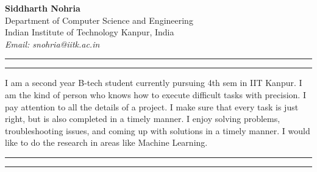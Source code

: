 \documentclass{article}
\begin{document}
\begin{flushleft}
\textbf{Siddharth Nohria} \\
Department of Computer Science and Engineering \\
Indian Institute of Technology Kanpur, India \\
\textit{Email: snohria@iitk.ac.in} \\
\end{flushleft}
\hrule
\vspace{0.3 em}
\hrule
\vspace{0.3 em}

\begin{flushleft}
I am a second year B-tech student currently pursuing 4th sem in IIT Kanpur. I am the kind of person who knows how to execute difficult tasks with precision. I pay attention to all the details of a project. I make sure that every task is just right, but is also completed in a timely manner. I enjoy solving problems, troubleshooting issues, and coming up with solutions in a timely manner. I would like to do the research in areas like Machine Learning.
\end{flushleft}

\hrule
\vspace{0.3 em}
\hrule
\vspace{0.3 em}
\end{document}
